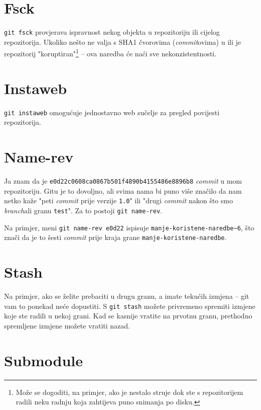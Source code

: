 \section*{Fsck}

\verb+git fsck+ provjerava ispravnost nekog objekta u repozitoriju ili cijelog repozitorija.
Ukoliko nešto ne valja s SHA1 čvorovima (\emph{commit}ovima) u ili je repozitorij "koruptiran"\footnote{Može se dogoditi, na primjer, ako je nestalo struje dok ste s repozitorijem radili neku radnju koja zahtijeva puno snimanja po disku.} -- ova naredba će naći sve nekonzistentnosti.

\section*{Instaweb}

\verb+git instaweb+ omogućuje jednostavno web sučelje za pregled povijesti repozitorija.

\section*{Name-rev}

Ja znam da je \verb+e0d22c0608ca0867b501f4890b4155486e8896b8+ \emph{commit} u mom repozitoriju.
Gitu je to dovoljno, ali svima nama bi puno više značilo da nam netko kaže "peti \emph{commit} prije verzije \verb+1.0+" ili "drugi \emph{commit} nakon što smo \emph{branch}ali granu \verb+test+".
Za to postoji \verb+git name-rev+.

Na primjer, meni \verb+git name-rev e0d22+ ispisuje \verb+manje-koristene-naredbe~6+, što znači da je to šesti \emph{commit} prije kraja grane \verb+manje-koristene-naredbe+.

\section*{Stash}

Na primjer, ako se želite prebaciti u drugu granu, a imate tekućih izmjena -- git vam to ponekad neće dopustiti.
S \verb+git stash+ možete privremeno spremiti izmjene koje ste radili u nekoj grani.
Kad se kasnije vratite na prvotnu granu, prethodno spremljene izmjene možete vratiti nazad.

\section*{Submodule}

